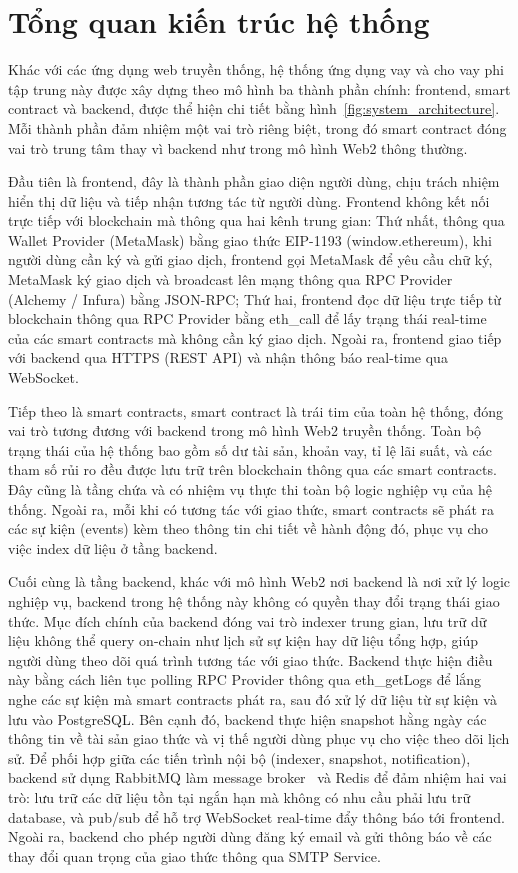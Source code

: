 \documentclass[../DoAn.tex]{subfiles}
\begin{document}
\section{Tổng quan kiến trúc hệ thống}


Khác với các ứng dụng web truyền thống, hệ thống ứng dụng vay và cho vay phi tập trung này được xây dựng theo mô hình ba thành phần chính: frontend, smart contract và backend, được thể hiện chi tiết bằng hình~\ref{fig:system_architecture}. Mỗi thành phần đảm nhiệm một vai trò riêng biệt, trong đó smart contract đóng vai trò trung tâm thay vì backend như trong mô hình Web2 thông thường.

Đầu tiên là frontend, đây là thành phần giao diện người dùng, chịu trách nhiệm hiển thị dữ liệu và tiếp nhận tương tác từ người dùng. Frontend không kết nối trực tiếp với blockchain mà thông qua hai kênh trung gian: Thứ nhất, thông qua Wallet Provider (MetaMask) bằng giao thức EIP-1193 (window.ethereum), khi người dùng cần ký và gửi giao dịch, frontend gọi MetaMask để yêu cầu chữ ký, MetaMask ký giao dịch và broadcast lên mạng thông qua RPC Provider (Alchemy / Infura) bằng JSON-RPC; Thứ hai, frontend đọc dữ liệu trực tiếp từ blockchain thông qua RPC Provider bằng eth\_call để lấy trạng thái real-time của các smart contracts mà không cần ký giao dịch. Ngoài ra, frontend giao tiếp với backend qua HTTPS (REST API) và nhận thông báo real-time qua WebSocket.

Tiếp theo là smart contracts, smart contract là trái tim của toàn hệ thống, đóng vai trò tương đương với backend trong mô hình Web2 truyền thống. Toàn bộ trạng thái của hệ thống bao gồm số dư tài sản, khoản vay, tỉ lệ lãi suất, và các tham số rủi ro đều được lưu trữ trên blockchain thông qua các smart contracts. Đây cũng là tầng chứa và có nhiệm vụ thực thi toàn bộ logic nghiệp vụ của hệ thống. Ngoài ra, mỗi khi có tương tác với giao thức, smart contracts sẽ phát ra các sự kiện (events) kèm theo thông tin chi tiết về hành động đó, phục vụ cho việc index dữ liệu ở tầng backend.

Cuối cùng là tầng backend, khác với mô hình Web2 nơi backend là nơi xử lý logic nghiệp vụ, backend trong hệ thống này không có quyền thay đổi trạng thái giao thức. Mục đích chính của backend đóng vai trò indexer trung gian, lưu trữ dữ liệu không thể query on-chain như lịch sử sự kiện hay dữ liệu tổng hợp, giúp người dùng theo dõi quá trình tương tác với giao thức. Backend thực hiện điều này bằng cách liên tục polling RPC Provider thông qua eth\_getLogs để lắng nghe các sự kiện mà smart contracts phát ra, sau đó xử lý dữ liệu từ sự kiện và lưu vào PostgreSQL. Bên cạnh đó, backend thực hiện snapshot hằng ngày các thông tin về tài sản giao thức và vị thế người dùng phục vụ cho việc theo dõi lịch sử. Để phối hợp giữa các tiến trình nội bộ (indexer, snapshot, notification), backend sử dụng RabbitMQ làm message broker~\cite{RabbitMQDocs} và Redis để đảm nhiệm hai vai trò: lưu trữ các dữ liệu tồn tại ngắn hạn mà không có nhu cầu phải lưu trữ database, và pub/sub để hỗ trợ WebSocket real-time đẩy thông báo tới frontend. Ngoài ra, backend cho phép người dùng đăng ký email và gửi thông báo về các thay đổi quan trọng của giao thức thông qua SMTP Service.
\end{document}

